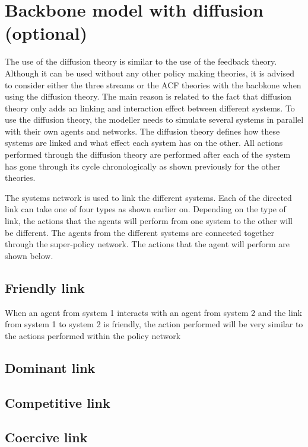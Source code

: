 \section{Backbone model with diffusion (optional)}
\label{sec:modelDiffusion}

The use of the diffusion theory is similar to the use of the feedback theory. Although it can be used without any other policy making theories, it is advised to consider either the three streams or the ACF theories with the bacbkone when using the diffusion theory. The main reason is related to the fact that diffusion theory only adds an linking and interaction effect between different systems. To use the diffusion theory, the modeller needs to simulate several systems in parallel with their own agents and networks. The diffusion theory defines how these systems are linked and what effect each system has on the other. All actions performed through the diffusion theory are performed after each of the system has gone through its cycle chronologically as shown previously for the other theories.

The systems network is used to link the different systems. Each of the directed link can take one of four types as shown earlier on. Depending on the type of link, the actions that the agents will perform from one system to the other will be different. The agents from the different systems are connected together through the super-policy network. The actions that the agent will perform are shown below.

\subsection{Friendly link}

When an agent from system 1 interacts with an agent from system 2 and the link from system 1 to system 2 is friendly, the action performed will be very similar to the actions performed within the policy network


\subsection{Dominant link}

\subsection{Competitive link}


\subsection{Coercive link}



